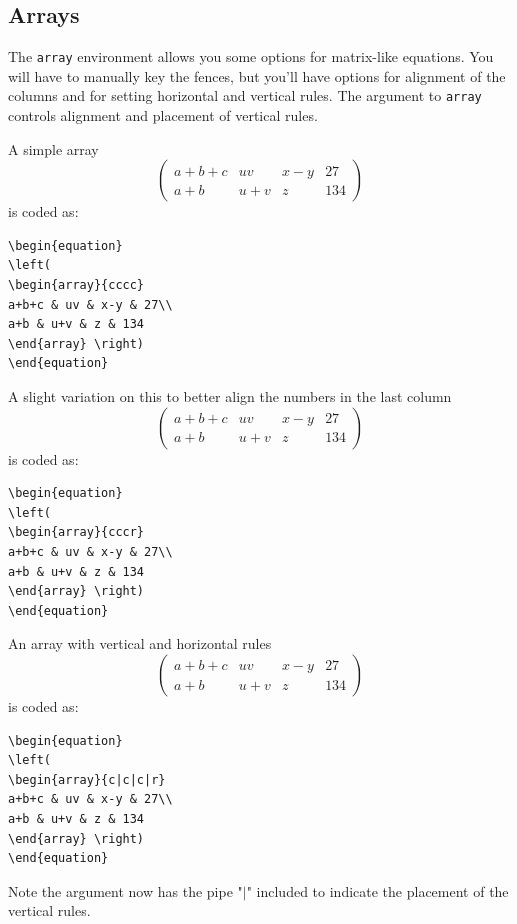 \documentclass[lettersize,journal]{IEEEtran}
\begin{document}
\subsection{Arrays}
\noindent The {\tt{array}} environment allows you some options for matrix-like equations. You will have to manually key the fences, but you'll have options for alignment of the columns and for setting horizontal and vertical rules. The argument to {\tt{array}} controls alignment and placement of vertical rules.

A simple array
\begin{equation}
  \left(
  \begin{array}{cccc}
    a+b+c & uv  & x-y & 27  \\
    a+b   & u+v & z   & 134
  \end{array}\right)
\end{equation}
is coded as:
\begin{verbatim}
\begin{equation}
\left(
\begin{array}{cccc}
a+b+c & uv & x-y & 27\\
a+b & u+v & z & 134
\end{array} \right)
\end{equation}
\end{verbatim}

A slight variation on this to better align the numbers in the last column
\begin{equation}
  \left(
  \begin{array}{cccr}
    a+b+c & uv  & x-y & 27  \\
    a+b   & u+v & z   & 134
  \end{array}\right)
\end{equation}
is coded as:
\begin{verbatim}
\begin{equation}
\left(
\begin{array}{cccr}
a+b+c & uv & x-y & 27\\
a+b & u+v & z & 134
\end{array} \right)
\end{equation}
\end{verbatim}

An array with vertical and horizontal rules
\begin{equation}
  \left( \begin{array}{c|c|c|r}
    a+b+c & uv  & x-y & 27  \\ \hline
    a+b   & u+v & z   & 134
  \end{array}\right)
\end{equation}
is coded as:
\begin{verbatim}
\begin{equation}
\left(
\begin{array}{c|c|c|r}
a+b+c & uv & x-y & 27\\
a+b & u+v & z & 134
\end{array} \right)
\end{equation}
\end{verbatim}
Note the argument now has the pipe "$\vert$" included to indicate the placement of the vertical rules.
\end{document}
